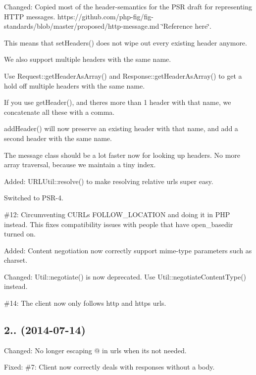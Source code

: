 \begin{DoxyItemize}
\item Changed\+: Copied most of the header-\/semantics for the P\+SR draft for representing H\+T\+TP messages. https\+://github.com/php-\/fig/fig-\/standards/blob/master/proposed/http-\/message.\+md \char`\"{}\+Reference here\char`\"{}.
\item This means that {\ttfamily set\+Headers()} does not wipe out every existing header anymore.
\item We also support multiple headers with the same name.
\item Use {\ttfamily Request\+::get\+Header\+As\+Array()} and {\ttfamily Response\+::get\+Header\+As\+Array()} to get a hold off multiple headers with the same name.
\item If you use {\ttfamily get\+Header()}, and there\textquotesingle{}s more than 1 header with that name, we concatenate all these with a comma.
\item {\ttfamily add\+Header()} will now preserve an existing header with that name, and add a second header with the same name.
\item The message class should be a lot faster now for looking up headers. No more array traversal, because we maintain a tiny index.
\item Added\+: {\ttfamily U\+R\+L\+Util\+::resolve()} to make resolving relative urls super easy.
\item Switched to P\+S\+R-\/4.
\item \#12\+: Circumventing C\+U\+RL\textquotesingle{}s F\+O\+L\+L\+O\+W\+\_\+\+L\+O\+C\+A\+T\+I\+ON and doing it in P\+HP instead. This fixes compatibility issues with people that have open\+\_\+basedir turned on.
\item Added\+: Content negotiation now correctly support mime-\/type parameters such as charset.
\item Changed\+: {\ttfamily Util\+::negotiate()} is now deprecated. Use {\ttfamily Util\+::negotiate\+Content\+Type()} instead.
\item \#14\+: The client now only follows http and https urls.
\end{DoxyItemize}

\subsection*{2.. (2014-\/07-\/14) }


\begin{DoxyItemize}
\item Changed\+: No longer escaping @ in urls when it\textquotesingle{}s not needed.
\item Fixed\+: \#7\+: Client now correctly deals with responses without a body.
\end{DoxyItemize}

